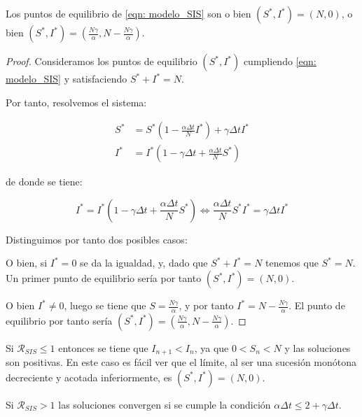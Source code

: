 \begin{lemma}
Los puntos de equilibrio de \eqref{eqn: modelo_SIS} son o bien $(S^*,I^*)=(N,0)$, o bien $(S^*,I^*)=(\frac{N\gamma}{\alpha}, N-\frac{N\gamma}{\alpha})$.
\end{lemma}

\begin{proof}
Consideramos los puntos de equilibrio $(S^*, I^*)$ cumpliendo \eqref{eqn: modelo_SIS} y satisfaciendo $S^*+I^*=N$.

Por tanto, resolvemos el sistema:

\begin{equation}
\begin{aligned}
S^* & = S^* \left(1-\frac{\alpha\Delta t}{N} I^* \right) + \gamma \Delta t I^* \\
I^* & = I^* \left( 1-\gamma \Delta t + \frac{\alpha\Delta t}{N} S^* \right)
\end{aligned}
\end{equation}

de donde se tiene:

$$I^* = I^* \left( 1-\gamma \Delta t + \frac{\alpha\Delta t}{N} S^* \right) \Leftrightarrow \frac{\alpha\Delta t}{N} S^*I^* = \gamma\Delta t I^*$$

Distinguimos por tanto dos posibles casos:

O bien, si $I^*=0$ se da la igualdad, y, dado que $S^*+I^*=N$ tenemos que $S^*=N$. Un primer punto de equilibrio sería por tanto $(S^*,I^*)=(N,0)$.

O bien $I^*\neq 0$, luego se tiene que $S=\frac{N\gamma}{\alpha}$, y por tanto $I^*=N-\frac{N\gamma}{\alpha}$. El punto de equilibrio por tanto sería $(S^*,I^*)=(\frac{N\gamma}{\alpha}, N-\frac{N\gamma}{\alpha})$.


\end{proof}


\begin{lemma}
Si $\mathcal{R}_{SIS}\leq 1$ entonces se tiene que $I_{n+1} < I_n$, ya que $0<S_n<N$ y las soluciones son positivas. En este caso es fácil ver que el límite, al ser una sucesión monótona decreciente y acotada inferiormente, es $(S^*,I^*)=(N,0)$.

Si $\mathcal{R}_{SIS}>1$ las soluciones convergen si se cumple la condición $\alpha \Delta t \leq 2+\gamma \Delta t$.
\end{lemma}

